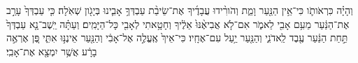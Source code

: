 \documentclass{openreader}
\begin{document}
וְהָיָ֗ה כִּרְאֹותֹ֛ו כִּי־אֵ֥ין הַנַּ֖עַר וָמֵ֑ת וְהֹורִ֨ידוּ עֲבָדֶ֜יךָ אֶת־שֵׂיבַ֨ת עַבְדְּךָ֥ אָבִ֛ינוּ בְּיָגֹ֖ון שְׁאֹֽלָה׃ 
כִּ֤י עַבְדְּךָ֙ עָרַ֣ב אֶת־הַנַּ֔עַר מֵעִ֥ם אָבִ֖י לֵאמֹ֑ר אִם־לֹ֤א אֲבִיאֶ֨נּוּ֙ אֵלֶ֔יךָ וְחָטָ֥אתִי לְאָבִ֖י כָּל־הַיָּמִֽים׃ 
וְעַתָּ֗ה יֵֽשֶׁב־נָ֤א עַבְדְּךָ֙ תַּ֣חַת הַנַּ֔עַר עֶ֖בֶד לַֽאדֹנִ֑י וְהַנַּ֖עַר יַ֥עַל עִם־אֶחָֽיו׃ 
כִּי־אֵיךְ֙ אֶֽעֱלֶ֣ה אֶל־אָבִ֔י וְהַנַּ֖עַר אֵינֶנּ֣וּ אִתִּ֑י פֶּ֚ן אֶרְאֶ֣ה בָרָ֔ע אֲשֶׁ֥ר יִמְצָ֖א אֶת־אָבִֽי׃ 
\end{document}
